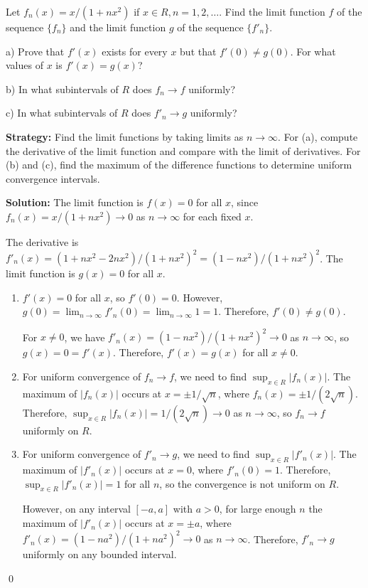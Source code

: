 \begin{problembox}
\begin{problemstatement}
Let \( f_n(x) = x/(1 + nx^2) \) if \( x \in R, n = 1, 2, \ldots \). Find the limit function \( f \) of the sequence \(\{f_n\}\) and the limit function \( g \) of the sequence \(\{f'_n\}\).

a) Prove that \( f'(x) \) exists for every \( x \) but that \( f'(0) \neq g(0) \). For what values of \( x \) is \( f'(x) = g(x) \)?

b) In what subintervals of \( R \) does \( f_n \to f \) uniformly?

c) In what subintervals of \( R \) does \( f'_n \to g \) uniformly?
\end{problemstatement}
\end{problembox}

\noindent\textbf{Strategy:} Find the limit functions by taking limits as \( n \to \infty \). For (a), compute the derivative of the limit function and compare with the limit of derivatives. For (b) and (c), find the maximum of the difference functions to determine uniform convergence intervals.

\bigskip\noindent\textbf{Solution:} The limit function is \( f(x) = 0 \) for all \( x \), since \( f_n(x) = x/(1 + nx^2) \to 0 \) as \( n \to \infty \) for each fixed \( x \).

The derivative is \( f'_n(x) = (1 + nx^2 - 2nx^2)/(1 + nx^2)^2 = (1 - nx^2)/(1 + nx^2)^2 \). The limit function is \( g(x) = 0 \) for all \( x \).

\begin{enumerate}[label=(\alph*)]
\item \( f'(x) = 0 \) for all \( x \), so \( f'(0) = 0 \). However, \( g(0) = \lim_{n \to \infty} f'_n(0) = \lim_{n \to \infty} 1 = 1 \). Therefore, \( f'(0) \neq g(0) \).

For \( x \neq 0 \), we have \( f'_n(x) = (1 - nx^2)/(1 + nx^2)^2 \to 0 \) as \( n \to \infty \), so \( g(x) = 0 = f'(x) \). Therefore, \( f'(x) = g(x) \) for all \( x \neq 0 \).

\item For uniform convergence of \( f_n \to f \), we need to find \( \sup_{x \in R} |f_n(x)| \). The maximum of \( |f_n(x)| \) occurs at \( x = \pm 1/\sqrt{n} \), where \( f_n(x) = \pm 1/(2\sqrt{n}) \). Therefore, \( \sup_{x \in R} |f_n(x)| = 1/(2\sqrt{n}) \to 0 \) as \( n \to \infty \), so \( f_n \to f \) uniformly on \( R \).

\item For uniform convergence of \( f'_n \to g \), we need to find \( \sup_{x \in R} |f'_n(x)| \). The maximum of \( |f'_n(x)| \) occurs at \( x = 0 \), where \( f'_n(0) = 1 \). Therefore, \( \sup_{x \in R} |f'_n(x)| = 1 \) for all \( n \), so the convergence is not uniform on \( R \).

However, on any interval \([-a, a]\) with \( a > 0 \), for large enough \( n \) the maximum of \( |f'_n(x)| \) occurs at \( x = \pm a \), where \( f'_n(x) = (1 - na^2)/(1 + na^2)^2 \to 0 \) as \( n \to \infty \). Therefore, \( f'_n \to g \) uniformly on any bounded interval.
\end{enumerate}\qed


